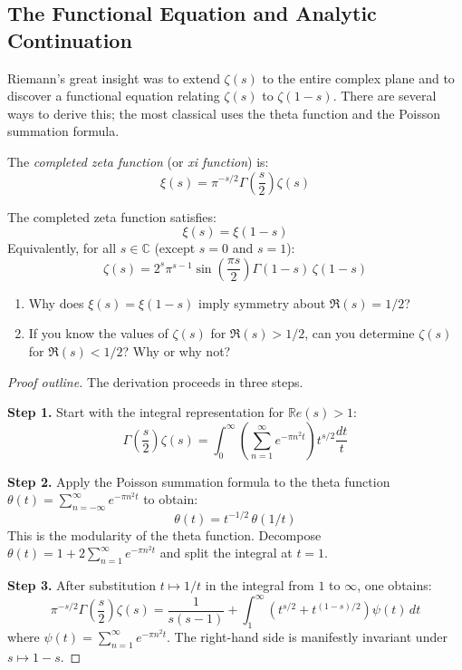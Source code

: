 \subsection{The Functional Equation and Analytic Continuation}

Riemann's great insight was to extend $\zeta(s)$ to the entire complex plane and to discover a functional equation relating $\zeta(s)$ to $\zeta(1-s)$. There are several ways to derive this; the most classical uses the theta function and the Poisson summation formula.

\begin{definition}
The \textit{completed zeta function} (or \textit{xi function}) is:
\[
\xi(s) = \pi^{-s/2} \Gamma\left(\frac{s}{2}\right) \zeta(s)
\]
\end{definition}

\begin{theorem}
\label{thm:func}
The completed zeta function satisfies:
\[
\xi(s) = \xi(1-s)
\]
Equivalently, for all $s \in \mathbb{C}$ (except $s = 0$ and $s = 1$):
\[
\zeta(s) = 2^s \pi^{s-1} \sin\left(\frac{\pi s}{2}\right) \Gamma(1-s) \, \zeta(1-s)
\]
\end{theorem}

\begin{checkyou}
\begin{enumerate}
  \item Why does $\xi(s) = \xi(1-s)$ imply symmetry about $\Re(s) = 1/2$?
  \item If you know the values of $\zeta(s)$ for $\Re(s) > 1/2$, can you determine $\zeta(s)$ for $\Re(s) < 1/2$? Why or why not?
\end{enumerate}
\end{checkyou}

\begin{proof}[Proof outline]
The derivation proceeds in three steps.

\textbf{Step 1.} Start with the integral representation for $\mathbb{R}e(s) > 1$:
\[
\Gamma\left(\frac{s}{2}\right) \zeta(s) = \int_0^{\infty} \left(\sum_{n=1}^{\infty} e^{-\pi n^2 t}\right) t^{s/2} \frac{dt}{t}
\]

\textbf{Step 2.} Apply the Poisson summation formula to the theta function $\theta(t) = \sum_{n=-\infty}^{\infty} e^{-\pi n^2 t}$ to obtain:
\[
\theta(t) = t^{-1/2} \, \theta(1/t)
\]
This is the modularity of the theta function. Decompose $\theta(t) = 1 + 2\sum_{n=1}^{\infty} e^{-\pi n^2 t}$ and split the integral at $t = 1$.

\textbf{Step 3.} After substitution $t \mapsto 1/t$ in the integral from $1$ to $\infty$, one obtains:
\[
\pi^{-s/2} \Gamma\left(\frac{s}{2}\right) \zeta(s) = \frac{1}{s(s-1)} + \int_1^{\infty} \left(t^{s/2} + t^{(1-s)/2}\right) \psi(t) \, dt
\]
where $\psi(t) = \sum_{n=1}^{\infty} e^{-\pi n^2 t}$. The right-hand side is manifestly invariant under $s \mapsto 1-s$.
\end{proof}

